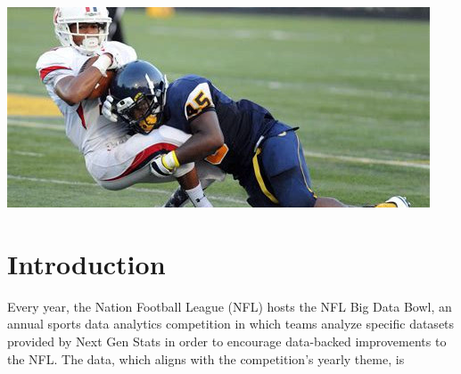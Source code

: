 \documentclass[bibtex, sigconf, hyperref={colorlinks=true,linkcolor=blue,urlcolor=blue}]{acmart}
\begin{document}



\begin{teaserfigure}
  \includegraphics[width=\textwidth]{./th-4169371817}
  \label{fig:teaser}
\end{teaserfigure}


\maketitle

\section{Introduction}

Every year, the Nation Football League (NFL) hosts the NFL Big Data Bowl, an annual
sports data analytics competition in which teams analyze specific datasets
provided by Next Gen Stats in order to encourage data-backed improvements to the
NFL. The data, which aligns with the competition's yearly theme, is
\end{document}
